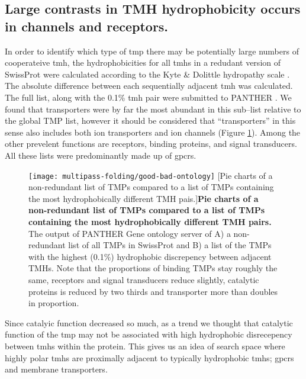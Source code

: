 \subsection{Large contrasts in TMH hydrophobicity occurs in channels and receptors.}
In order to identify which type of \gls{tmp} there may be potentially large numbers of cooperateive \gls{tmh}, the hydrophobicities for all \gls{tmh}s in a redudant version of SwissProt were calculated according to the Kyte \& Dolittle hydropathy scale \cite{Kyte1982}.
The absolute difference between each sequentially adjacent \gls{tmh} was calculated.
The full list, along with the 0.1\% \gls{tmh} pair were submitted to PANTHER \cite{Mi2017}.
We found that transporters were by far the most abundant in this sub\---list relative to the global TMP list, however it should be considered that ``transporters'' in this sense also includes both ion transporters and ion channels (Figure \ref{fig:good-bad-ontology}).
Among the other prevelent functions are receptors, binding proteins, and signal transducers.
All these lists were predominantly made up of \gls{gpcr}s.


\begin{figure}[!ht]
\centering
\texttt{[image: multipass-folding/good-bad-ontology]}
		[Pie charts of a non-redundant list of TMPs compared to a list of TMPs containing the most hydrophobically different TMH pais.]{\textbf{Pie charts of a non-redundant list of TMPs compared to a list of TMPs containing the most hydrophobically different TMH pairs.}
    The output of PANTHER Gene ontology server of A) a non-redundant list of all TMPs in SwissProt and
    B) a list of the TMPs with the highest (0.1\%) hydrophobic discrepency between adjacent TMHs.
    Note that the proportions of binding TMPs stay roughly the same, receptors and signal transducers reduce slightly, catalytic proteins is reduced by two thirds and transporter more than doubles in proportion.
    }

\label{fig:good-bad-ontology}
\end{figure}

Since catalyic function decreased so much, as a trend we thought that catalytic function of the \gls{tmp} may not be associated with high hydrophobic disrecepency between \gls{tmh}s within the protein.
This gives us an idea of search space where highly polar \gls{tmh}s are proximally adjacent to typically hydrophobic \gls{tmh}s; \gls{gpcr}s and membrane transporters.

